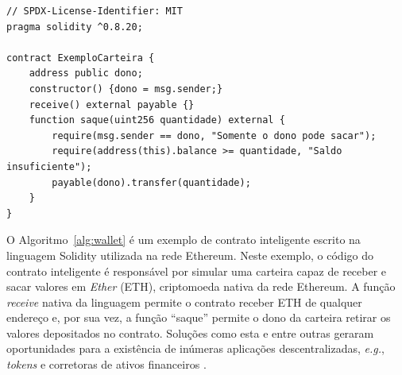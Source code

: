 \documentclass[12pt]{article}
\begin{document}
\begin{lstlisting}[language=Solidity, caption={Exemplo de código-fonte de um contrato inteligente em Solidity.}, label={alg:wallet}, xleftmargin=1.5cm]
// SPDX-License-Identifier: MIT
pragma solidity ^0.8.20;

contract ExemploCarteira {
    address public dono;
    constructor() {dono = msg.sender;}
    receive() external payable {}
    function saque(uint256 quantidade) external {
        require(msg.sender == dono, "Somente o dono pode sacar");
        require(address(this).balance >= quantidade, "Saldo insuficiente");
        payable(dono).transfer(quantidade);
    }
}
\end{lstlisting}

O Algoritmo~\ref{alg:wallet} é um exemplo de contrato inteligente escrito na linguagem Solidity utilizada na rede Ethereum. Neste exemplo, o código do contrato inteligente é responsável por simular uma carteira capaz de receber e sacar valores em \textit{Ether} (ETH), criptomoeda nativa da rede Ethereum. A função \textit{receive} nativa da linguagem permite o contrato receber ETH de qualquer endereço e, por sua vez, a função ``saque'' permite o dono da carteira retirar os valores depositados no contrato. Soluções como esta e entre outras geraram oportunidades para a existência de inúmeras aplicações descentralizadas, \textit{e.g.}, \textit{tokens} e corretoras de ativos financeiros \cite{mendonca2022nfts}.



\end{document}

